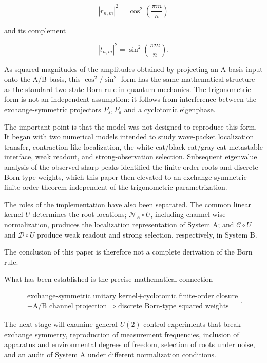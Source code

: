 \documentclass[
  a4paper,
  10pt]{article}
\begin{document}
\[
\boxed{
|r_{n,m}|^2=\cos^2\left(\frac{\pi m}{n}\right)
}
\]

and its complement

\[
\boxed{
|t_{n,m}|^2=\sin^2\left(\frac{\pi m}{n}\right)
}.
\]

As squared magnitudes of the amplitudes obtained by projecting an
A-basis input onto the A/B basis, this \(\cos^2/\sin^2\) form has the
same mathematical structure as the standard two-state Born rule in
quantum mechanics. The trigonometric form is not an independent
assumption: it follows from interference between the exchange-symmetric
projectors \(P_s,P_a\) and a cyclotomic eigenphase.

The important point is that the model was not designed to reproduce this
form. It began with two numerical models intended to study wave-packet
localization transfer, contraction-like localization, the
white-cat/black-cat/gray-cat metastable interface, weak readout, and
strong-observation selection. Subsequent eigenvalue analysis of the
observed sharp peaks identified the finite-order roots and discrete
Born-type weights, which this paper then elevated to an
exchange-symmetric finite-order theorem independent of the trigonometric
parametrization.

The roles of the implementation have also been separated. The common
linear kernel \(U\) determines the root locations;
\(\mathcal N_A\circ U\), including channel-wise normalization, produces
the localization representation of System A; and \(\mathcal C\circ U\)
and \(\mathcal D\circ U\) produce weak readout and strong selection,
respectively, in System B.

The conclusion of this paper is therefore not a complete derivation of
the Born rule.

What has been established is the precise mathematical connection

\[
\boxed{
\begin{gathered}
\text{exchange-symmetric unitary kernel}
+\text{cyclotomic finite-order closure}\\
+\text{A/B channel projection}
\Rightarrow\text{discrete Born-type squared weights}
\end{gathered}
}.
\]

The next stage will examine general \(U(2)\) control experiments that
break exchange symmetry, reproduction of measurement frequencies,
inclusion of apparatus and environmental degrees of freedom, selection
of roots under noise, and an audit of System A under different
normalization conditions.
\end{document}

